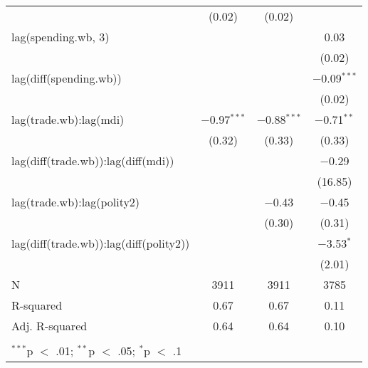 \begin{table}[!htbp]
\begin{tabular}{@{\extracolsep{5pt}}lccc}
  & (0.02) & (0.02) &  \\ 
  lag(spending.wb, 3) &  &  & 0.03 \\ 
  &  &  & (0.02) \\ 
  lag(diff(spending.wb)) &  &  & $-$0.09$^{***}$ \\ 
  &  &  & (0.02) \\ 
  lag(trade.wb):lag(mdi) & $-$0.97$^{***}$ & $-$0.88$^{***}$ & $-$0.71$^{**}$ \\ 
  & (0.32) & (0.33) & (0.33) \\ 
  lag(diff(trade.wb)):lag(diff(mdi)) &  &  & $-$0.29 \\ 
  &  &  & (16.85) \\ 
  lag(trade.wb):lag(polity2) &  & $-$0.43 & $-$0.45 \\ 
  &  & (0.30) & (0.31) \\ 
  lag(diff(trade.wb)):lag(diff(polity2)) &  &  & $-$3.53$^{*}$ \\ 
  &  &  & (2.01) \\ 
 N & 3911 & 3911 & 3785 \\ 
R-squared & 0.67 & 0.67 & 0.11 \\ 
Adj. R-squared & 0.64 & 0.64 & 0.10 \\ 
\hline \\[-1.8ex] 
\multicolumn{4}{l}{$^{***}$p $<$ .01; $^{**}$p $<$ .05; $^{*}$p $<$ .1} \\ 
\end{tabular} 
\end{table} 
